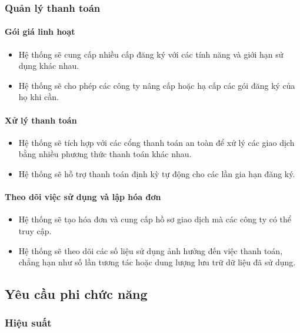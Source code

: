 \subsubsection{Quản lý thanh toán}

\paragraph{Gói giá linh hoạt}
\begin{itemize}
    \item Hệ thống sẽ cung cấp nhiều cấp đăng ký với các tính năng và giới hạn sử dụng khác nhau.
    \item Hệ thống sẽ cho phép các công ty nâng cấp hoặc hạ cấp các gói đăng ký của họ khi cần.
\end{itemize}

\paragraph{Xử lý thanh toán}
\begin{itemize}
    \item Hệ thống sẽ tích hợp với các cổng thanh toán an toàn để xử lý các giao dịch bằng nhiều phương thức thanh toán khác nhau.
    \item Hệ thống sẽ hỗ trợ thanh toán định kỳ tự động cho các lần gia hạn đăng ký.
\end{itemize}

\paragraph{Theo dõi việc sử dụng và lập hóa đơn}
\begin{itemize}
    \item Hệ thống sẽ tạo hóa đơn và cung cấp hồ sơ giao dịch mà các công ty có thể truy cập.
    \item Hệ thống sẽ theo dõi các số liệu sử dụng ảnh hưởng đến việc thanh toán, chẳng hạn như số lần tương tác hoặc dung lượng lưu trữ dữ liệu đã sử dụng.
\end{itemize}

\subsection{Yêu cầu phi chức năng}

\subsubsection{Hiệu suất}

